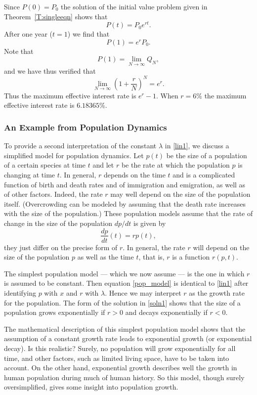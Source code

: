 \documentclass{ximera}
\begin{document}
Since $P(0)=P_0$ the solution of the initial value problem given
in Theorem~\ref{T:singleeqn} shows that
\[
P(t) = P_0 e^{rt}.
\]
After one year ($t=1$) we find that
\[
P(1) =  e^r P_0.
\]
Note that
\[
P(1) = \lim_{N\to\infty} Q_N,
\]
and we have thus verified that
\[
 \lim_{N\to\infty} \left(1 + \frac{r}{N}\right)^N = e^r.
\]
Thus the maximum effective interest rate is $e^r-1$.  When $r=6\%$
the maximum effective interest rate is $6.18365\%$.


\subsubsection*{An Example from Population Dynamics}

To provide a second interpretation of the constant $\lambda$ in
\eqref{lin1}, we discuss a simplified model for population dynamics.
Let $p(t)$ be the size of a population of a certain species at
time $t$ and let $r$ be the rate at which the population $p$ is
changing at time $t$.  In general, $r$ depends on the time $t$
and is a complicated function of birth and death rates and of
immigration and emigration, as well as of other factors.
Indeed, the rate $r$ may well depend
on the size of the population itself.  (Overcrowding can be
modeled by assuming that the death rate increases with the size
of the population.) These population models assume that the
rate of change in the size of the population $dp/dt$ is given by
\begin{equation}  \label{pop_model}
        \frac{dp}{dt}(t) = r p(t),
\end{equation}
they just differ on the precise form of $r$.  In general, the
rate $r$ will depend on the size of the population $p$ as well
as the time $t$, that is, $r$ is a function $r(p,t)$.

The simplest population model --- which
we now assume --- is the
one in which $r$ is assumed to be constant.  Then equation
\eqref{pop_model} is identical to \eqref{lin1} after identifying $p$
with $x$ and $r$ with $\lambda$.  Hence we may interpret $r$ as
the growth rate for the population.  The form of the solution in
\eqref{soln1} shows that the size of a population grows
exponentially if $r>0$ and decays exponentially if $r<0$.

The mathematical description of this simplest population model
shows that the assumption of a constant growth rate leads to
exponential growth (or exponential decay).  Is this realistic?
Surely, no population will grow exponentially for all time, and
other factors, such as limited living space, have to be taken
into account.  On the other hand, exponential growth describes
well the growth in human population during much of human
history.  So this model, though surely oversimplified, gives
some insight into population growth.
\end{document}
